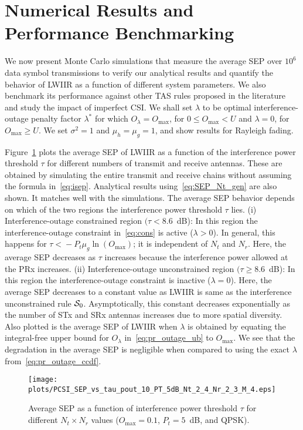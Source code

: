 \documentclass[12pt,draftcls,peerreview,onecolumn]{IEEEtran}
\newcommand{\lam}{\lambda}
\newcommand{\lamstar}{\lam^{*}}
\newcommand{\mug}{{\mu_{g}}}
\newcommand{\muh}{{\mu_{h}}}
\newcommand{\Nt}{{N_t}}
\newcommand{\Nr}{{N_r}}
\newcommand{\Pt}{{P_t}}
\newcommand{\noisevar}{\sigma^2}
\newcommand{\outmax}{O_{\text{max}}}
\newcommand{\itau}{\tau}
\newcommand{\out}{O}
\newcommand{\un}{U}
\newcommand{\caluncons}{{\cal S_{\text{0}}}}
\newcommand{\outlam}{\out_{\lam}}
\begin{document}
\section{Numerical Results and Performance Benchmarking}
\label{sec:results}
We now present Monte Carlo simulations that measure the average SEP over  $10^6$ data symbol transmissions to verify our analytical results and quantify the behavior of LWIIR as a function of different system parameters. We also benchmark its performance against other TAS rules proposed in the literature and study the impact of imperfect CSI. We shall set $\lam$ to be optimal interference-outage penalty factor $\lamstar$ for which $\outlam= \outmax$, for $0 \leq \outmax < \un$ and $\lam=0$,  for $\outmax \geq \un$. We set $\noisevar =1$ and $\muh =\mug = 1$, and show results for Rayleigh fading. 

Figure~\ref{fig:SEP_vs_tau} plots the average SEP of LWIIR as a function of the interference power threshold $\itau$ for different numbers of transmit and receive antennas. 
These are obtained by simulating the entire transmit and receive chains without assuming the formula in~\eqref{eq:isep}. Analytical results using~\eqref{eq:SEP_Nt_gen} are also shown. It matches well with the simulations. The average SEP behavior depends on which of the two regions the interference power threshold $\itau$ lies. (i) Interference-outage constrained region $(\itau < 8.6$~dB): In this region the interference-outage constraint in~\eqref{eq:cons} is active ($\lam>0$). In general, this happens for $\itau\!<\!-\Pt\mug\ln\left(\outmax\right)$; it is independent of $\Nt$ and $\Nr$. Here, the average SEP decreases as $\itau$ increases because the interference power allowed at the PRx increases. (ii) Interference-outage unconstrained region $(\itau \geq 8.6$~dB): In this region the interference-outage constraint is inactive ($\lam=0$). Here, the average SEP decreases to a constant value as LWIIR is same as the interference unconstrained rule $\caluncons$. Asymptotically, this constant decreases exponentially as the number of STx and SRx antennas increases due to more spatial diversity. Also plotted is the average SEP of LWIIR when $\lam$ is obtained by equating the integral-free upper bound for $\outlam$ in~\eqref{eq:pr_outage_ub} to $\outmax$. We see that the degradation in the average SEP  is negligible when compared to using the exact $\lam$ from~\eqref{eq:pr_outage_ccdf}. 

\begin{figure}
  \centering \texttt{[image: plots/PCSI\_SEP\_vs\_tau\_pout\_10\_PT\_5dB\_Nt\_2\_4\_Nr\_2\_3\_M\_4.eps]}
  \caption{Average SEP as a function of interference power threshold $\itau$ for different $\Nt \times \Nr$ values ($\outmax=0.1$,  $\Pt = 5$~dB, and QPSK).}
\label{fig:SEP_vs_tau}
\end{figure}
\end{document}
